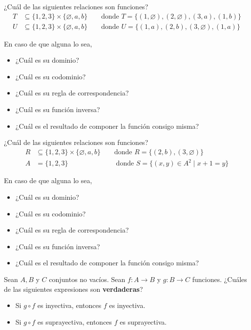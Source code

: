 \documentclass[oneside]{style}
\begin{document}
\begin{questions}[label=\protect\circled{\bfseries\arabic*}]
    \newpage
    \question
    {
        ¿Cuál de las siguientes relaciones son funciones?
        \begin{align*}
            T &\subseteq \{1,2,3\} \times \{\varnothing, a, b\} \quad \quad 
            \text{donde } T = \{(1, \varnothing), (2, \varnothing), (3,a), 
            (1,b)\} \\ 
            U &\subseteq \{1,2,3\} \times \{\varnothing, a, b\} \quad \quad 
            \text{donde } U = \{(1,a), (2,b), (3,\varnothing), (1,a)\}
        \end{align*}

        En caso de que alguna lo sea,
        \begin{itemize}
            \item ¿Cuál es su dominio?
            \item ¿Cuál es su codominio?
            \item ¿Cuál es su regla de correspondencia?
            \item ¿Cuál es su función inversa?
            \item ¿Cuál es el resultado de componer la función consigo misma?
        \end{itemize}
    }

    \question
    {
        ¿Cuál de las siguientes relaciones son funciones?
        \begin{align*}
            R &\subseteq \{1,2,3\} \times \{\varnothing, a, b\} \quad \quad 
            \text{donde } R = \{(2,b), (3,\varnothing)\} \\ 
            A &= \{1,2,3\} \quad \quad \quad \quad \quad \quad \quad 
            \text{donde } S = \{(x,y) \in A^2 \; | \; x+1=y\}
        \end{align*}

        En caso de que alguna lo sea,
        \begin{itemize}
            \item ¿Cuál es su dominio?
            \item ¿Cuál es su codominio?
            \item ¿Cuál es su regla de correspondencia?
            \item ¿Cuál es su función inversa?
            \item ¿Cuál es el resultado de componer la función consigo misma?
        \end{itemize}
    }

    \question
    {
        Sean $A,B$ y $C$ conjuntos no vacíos. Sean $f: A \rightarrow B$ y 
        $g: B \rightarrow C$ funciones. ¿Cuáles de las siguientes expresiones 
        son \textbf{verdaderas}?
        \begin{itemize}
            \item Si $g \circ f$ es inyectiva, entonces $f$ es inyectiva.
            \item Si $g \circ f$ es suprayectiva, entonces $f$ es suprayectiva.
        \end{itemize}
    }


\end{questions}
\end{document}

